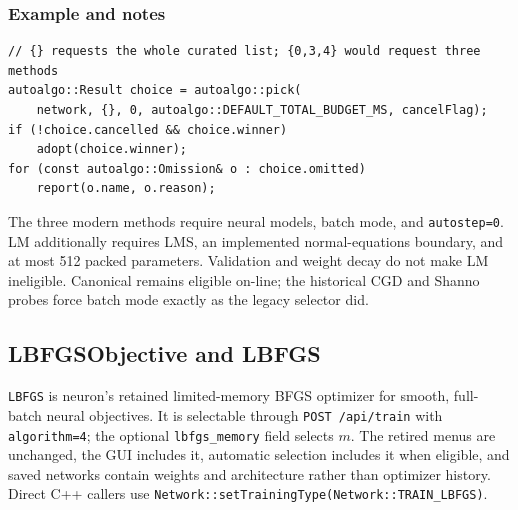 \subsubsection{Example and notes}
\begin{verbatim}
// {} requests the whole curated list; {0,3,4} would request three methods
autoalgo::Result choice = autoalgo::pick(
    network, {}, 0, autoalgo::DEFAULT_TOTAL_BUDGET_MS, cancelFlag);
if (!choice.cancelled && choice.winner)
    adopt(choice.winner);
for (const autoalgo::Omission& o : choice.omitted)
    report(o.name, o.reason);
\end{verbatim}

The three modern methods require neural models, batch mode, and
\texttt{autostep=0}. LM additionally requires LMS, an implemented
normal-equations boundary, and at most 512 packed parameters. Validation and
weight decay do not make LM ineligible. Canonical remains eligible on-line;
the historical CGD and Shanno probes force batch mode exactly as the legacy
selector did.

\subsection{LBFGSObjective and LBFGS}
\texttt{LBFGS} is neuron's retained limited-memory BFGS optimizer for smooth,
full-batch neural objectives. It is selectable through
\texttt{POST /api/train} with \texttt{algorithm=4}; the optional
\texttt{lbfgs\_memory} field selects $m$. The retired menus are unchanged, the
GUI includes it, automatic selection includes it when eligible, and saved networks
contain weights and architecture rather than optimizer history. Direct C++ callers use
\texttt{Network::setTrainingType(Network::TRAIN\_LBFGS)}.

